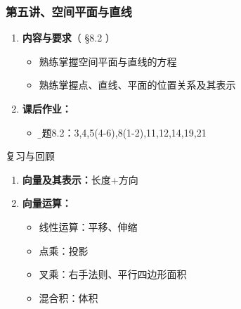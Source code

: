 
\begin{frame}
	\frametitle{第五讲、空间平面与直线}
	\linespread{1.5}
	\begin{enumerate}
	  \item {\bf 内容与要求}{\color{blue}（ \S8.2 ）}
	  \begin{itemize}
	    \item 熟练掌握空间平面与直线的方程
	    \item 熟练掌握点、直线、平面的位置关系及其表示
	  \vspace{1em}
	  \end{itemize}
	  \item {\bf  课后作业：}
	  \begin{itemize}
	    \item {\b 习题8.2：3,4,5(4-6),8(1-2),11,12,14,19,21}
	  \end{itemize}
	\end{enumerate}
\end{frame}

\begin{frame}[<+->]{复习与回顾}
	\linespread{1.5}
	\begin{enumerate}
	  \item {\bf 向量及其表示：}长度+方向
	  \item {\bf 向量运算：}
	  \begin{itemize}
	    \item 线性运算：平移、伸缩
	    \item 点乘：投影
	    \item 叉乘：右手法则、平行四边形面积
	    \item 混合积：体积
	  \end{itemize}
	\end{enumerate}
\end{frame}

